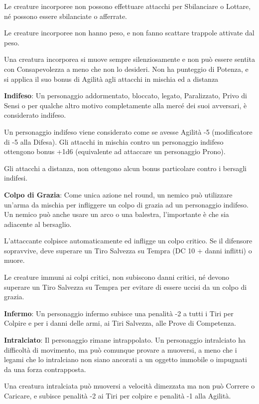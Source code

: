 \documentclass[a4paper,11pt,twoside,openany]{book}
\begin{document}
{Le creature incorporee non possono effettuare attacchi per Sbilanciare o Lottare, né possono essere sbilanciate o afferrate.

Le creature incorporee non hanno peso, e non fanno scattare trappole attivate dal peso.

Una creatura incorporea si muove sempre silenziosamente e non può essere sentita con Consapevolezza a meno che non lo desideri. Non ha punteggio di Potenza, e si applica il suo bonus di Agilità agli attacchi in mischia ed a distanza

\textbf{Indifeso}: Un personaggio addormentato, bloccato, legato, Paralizzato, Privo di Sensi o per qualche altro motivo completamente alla mercé dei suoi avversari, è considerato indifeso.

Un personaggio indifeso viene considerato come se avesse Agilità -5 (modificatore di -5 alla Difesa). Gli attacchi in mischia contro un personaggio indifeso ottengono bonus +1d6 (equivalente ad attaccare un personaggio Prono).

Gli attacchi a distanza, non ottengono alcun bonus particolare contro i bersagli indifesi.

\textbf{Colpo di Grazia}: Come unica azione nel round, un nemico può utilizzare un'arma da mischia per infliggere un colpo di grazia ad un personaggio indifeso. Un nemico può anche usare un arco o una balestra, l'importante è che sia adiacente al bersaglio.

L'attaccante colpisce automaticamente ed infligge un colpo critico. Se il difensore sopravvive, deve superare un Tiro Salvezza su Tempra (DC 10 + danni inflitti) o muore.

Le creature immuni ai colpi critici, non subiscono danni critici, né devono superare un Tiro Salvezza su Tempra per evitare di essere uccisi da un colpo di grazia.

\textbf{Infermo}: Un personaggio infermo subisce una penalità -2 a tutti i Tiri per Colpire e per i danni delle armi, ai Tiri Salvezza, alle Prove di Competenza.

\textbf{Intralciato}: Il personaggio rimane intrappolato. Un personaggio intralciato ha difficoltà di movimento, ma può comunque provare a muoversi, a meno che i legami che lo intralciano non siano ancorati a un oggetto immobile o impugnati da una forza contrapposta.

Una creatura intralciata può muoversi a velocità dimezzata ma non può Correre o Caricare, e subisce penalità -2 ai Tiri per colpire e penalità -1 alla Agilità. 

}
\end{document}
